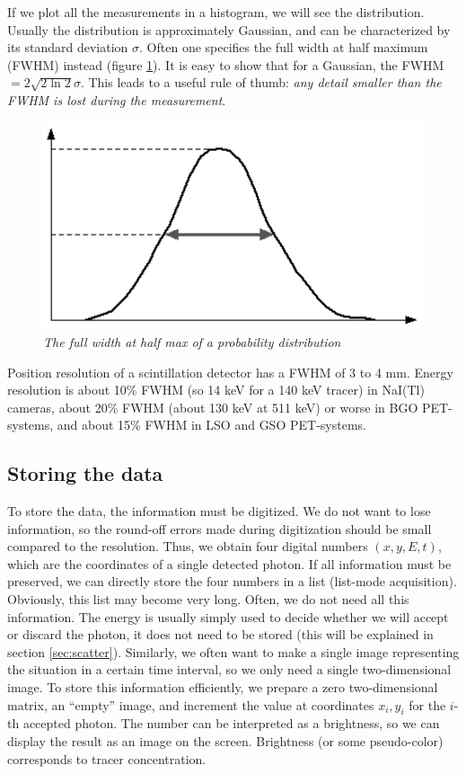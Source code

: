 If we plot all the measurements in a histogram, we will see the
distribution. Usually the distribution is approximately Gaussian, and can be
characterized by its standard deviation $\sigma$. Often one specifies the
full width at half maximum (FWHM) instead (figure \ref{fig:fwhm}). It is easy
to show that for a Gaussian, the FWHM $ = 2 \sqrt{2 \ln 2} \sigma$. This
leads to a useful rule of thumb: {\em any detail smaller than the FWHM is lost
during the measurement}.
 
\begin{figure}[tb]
\centering
\includegraphics[width=0.7\figone]{figs/fig_fwhm.pdf}
\caption{\label{fig:fwhm} \emph{The full width at half max of a probability
distribution}}
\end{figure}

Position resolution of a scintillation detector has a FWHM of 3 to 4 mm.
Energy resolution is about 10\% FWHM (so 14 keV for a 140 keV tracer) in
NaI(Tl) cameras, about 20\% FWHM (about 130 keV at 511 keV) or worse in
BGO PET-systems, and about 15\% FWHM in LSO and GSO PET-systems.

\subsection{Storing the data \label{sec:storing_data}}
To store the data, the information must be digitized. We do not want to lose
information, so the round-off errors made during digitization should be small
compared to the resolution. Thus, we obtain four digital numbers $(x, y, E,
t)$, which are the coordinates of a single detected photon. If all information
must be preserved, we can directly store the four numbers in a list (list-mode
acquisition). Obviously, this list may become very long. Often, we do not need
all this information. The energy is usually simply used to decide whether we
will accept or discard the photon, it does not need to be stored (this will be
explained in section \ref{sec:scatter}). Similarly, we often want to
make a single image representing the situation in a certain time interval, so
we only need a single two-dimensional image. To store this information
efficiently, we prepare a zero two-dimensional matrix, an ``empty'' image, and
increment the value at coordinates $x_i, y_i$ for the $i$-th accepted
photon. The number can be interpreted as a brightness, so we can display the
result as an image on the screen. Brightness (or some pseudo-color)
corresponds to tracer concentration.


